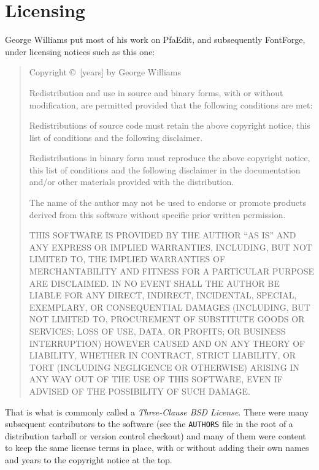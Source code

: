 \documentclass[11pt]{report}
\begin{document}
\clearpage
\fi

\chapter{Licensing}

George Williams put most of his work on PfaEdit, and subsequently FontForge,
under licensing notices such as this one:

\begin{quotation}
Copyright \copyright\ [years] by George Williams

Redistribution and use in source and binary forms, with or without
modification, are permitted provided that the following conditions are met:

Redistributions of source code must retain the above copyright notice, this
list of conditions and the following disclaimer.

Redistributions in binary form must reproduce the above copyright notice,
this list of conditions and the following disclaimer in the documentation
and/or other materials provided with the distribution.

The name of the author may not be used to endorse or promote products
derived from this software without specific prior written permission.

THIS SOFTWARE IS PROVIDED BY THE AUTHOR ``AS IS'' AND ANY EXPRESS OR IMPLIED
WARRANTIES, INCLUDING, BUT NOT LIMITED TO, THE IMPLIED WARRANTIES OF
MERCHANTABILITY AND FITNESS FOR A PARTICULAR PURPOSE ARE DISCLAIMED.  IN NO
EVENT SHALL THE AUTHOR BE LIABLE FOR ANY DIRECT, INDIRECT, INCIDENTAL,
SPECIAL, EXEMPLARY, OR CONSEQUENTIAL DAMAGES (INCLUDING, BUT NOT LIMITED TO,
PROCUREMENT OF SUBSTITUTE GOODS OR SERVICES; LOSS OF USE, DATA, OR PROFITS;
OR BUSINESS INTERRUPTION) HOWEVER CAUSED AND ON ANY THEORY OF LIABILITY,
WHETHER IN CONTRACT, STRICT LIABILITY, OR TORT (INCLUDING NEGLIGENCE OR
OTHERWISE) ARISING IN ANY WAY OUT OF THE USE OF THIS SOFTWARE, EVEN IF
ADVISED OF THE POSSIBILITY OF SUCH DAMAGE.
\end{quotation}

That is what is commonly called a \emph{Three-Clause BSD License}.  There
were many subsequent contributors to the software (see the \texttt{AUTHORS}
file in the root of a distribution tarball or version control checkout) and
many of them were content to keep the same license terms in place, with or
without adding their own names and years to the copyright notice at the
top.
\end{document}
